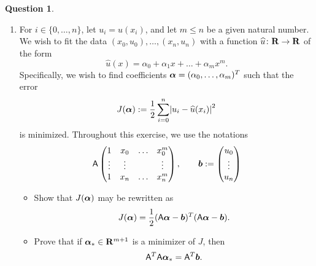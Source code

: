 \documentclass[11pt]{article}
\theoremstyle{definition}
\newtheorem{question}{Question}
\theoremstyle{remark}
\newtheorem*{protosolution}{Solution}
\newenvironment{solutionframe}
{%
    \begin{mdframed}[
        leftmargin=1cm,
        skipabove=.3cm,
        linecolor=blue,
        backgroundcolor=lightgreen,
        linewidth=0pt,
        innerleftmargin=.5em,
        innerrightmargin=.5em,
        innertopmargin=.3em,
        innerbottommargin=.6em,
    ]
}
{
    \end{mdframed}
}
\newenvironment{solution}
{\pushQED{\qed}\renewcommand{\qedsymbol}{$\triangle$}
\begin{solutionframe}\small \begin{protosolution}}
{\popQED\end{protosolution}\end{solutionframe}}
\begin{document}
\begin{question}
\begin{enumerate}
\begin{solution}
\begin{itemize}
                    \item
                        True.
                \end{itemize}
            \end{solution}
    \item
        For $i \in \{0, \dotsc, n\}$,
        let $u_i = u(x_i)$,
        and let $m \leq n$ be a given natural number.
        We wish to fit the data $(x_0, u_0), \dotsc, (x_n, u_n)$ with a function $\widehat u\colon \mathbf R \to \mathbf R$ of the form
        \[
            \widehat u(x) = \alpha_0 + \alpha_1 x + \dotsc + \alpha_m x^m.
        \]
        Specifically, we wish to find coefficients $\mathbf{\boldsymbol{\alpha}} = (\alpha_0, \dotsc, \alpha_m)^T$
        such that the error
        \[
            J(\vect \alpha) := \frac{1}{2}\sum_{i=0}^{n} \abs[big]{u_i - \widehat u(x_i)}^2
        \]
        is minimized.
        Throughout this exercise,
        we use the notations
        \[
            \mathsf A
            \begin{pmatrix}
                1 & x_0 & \hdots & x_0^m \\
                \vdots & \vdots & & \vdots \\
                1 & x_{n} & \hdots & x_n^m
            \end{pmatrix},
            \qquad
            \mathbf{\boldsymbol{b}} :=
            \begin{pmatrix}
                u_0 \\
                \vdots \\
                u_n
            \end{pmatrix}
        \]
        \begin{itemize}
            \item
                Show that $J(\mathbf{\boldsymbol{\alpha}})$ may be rewritten as
                \[
                    J(\mathbf{\boldsymbol{\alpha}}) = \frac{1}{2} (\mathsf A \mathbf{\boldsymbol{\alpha}}  - \mathbf{\boldsymbol{b}})^T (\mathsf A \mathbf{\boldsymbol{\alpha}}  - \mathbf{\boldsymbol{b}}).
                \]

            \item
                Prove that if $\mathbf{\boldsymbol{\alpha}}_* \in \mathbf R^{m+1}$ is a minimizer of $J$,
                then
                \begin{equation}
                    \label{eq:normal_equations}
                    \mathsf A^T \mathsf A \mathbf{\boldsymbol{\alpha}}_* = \mathsf A^T \mathbf{\boldsymbol{b}}.
                \end{equation}



\end{itemize}
\end{enumerate}
\end{question}
\end{document}
